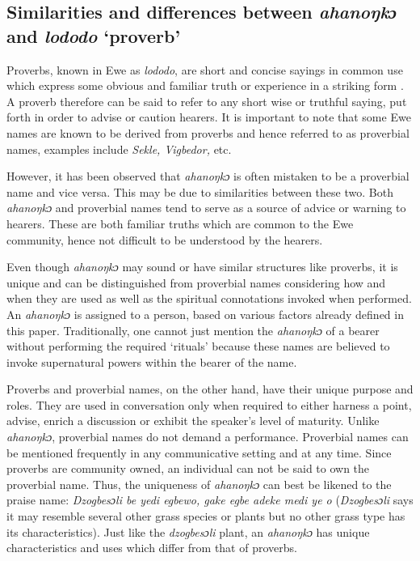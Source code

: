 \documentclass[output=paper]{langscibook}
\begin{document}
\subsection{Similarities and differences between \textit{ahanoŋkɔ} and \textit{lododo} `proverb'}
Proverbs, known in Ewe as {\textit{lododo}}, are short and concise sayings in common use which express some obvious and familiar truth or experience in a striking form  \citep[365]{d1977some}. A proverb therefore can be said to refer to any short wise or truthful saying, put forth in order to advise or caution hearers. It is important to note that some Ewe names are known to be derived from proverbs and hence referred to as proverbial names, examples include {\textit{Sekle, Vigbedor,}} etc.

However, it has been observed that {\textit{ahanoŋkɔ}} is often mistaken to be a proverbial name and vice versa. This may be due to similarities between these two. Both {\textit{ahanoŋkɔ}} and proverbial names tend to serve as a source of advice or warning to hearers. These are both familiar truths which are common to the Ewe community, hence not difficult to be understood by the hearers.

Even though {\textit{ahanoŋkɔ}} may sound or have similar structures like proverbs, it is unique and can be distinguished from proverbial names considering how and when they are used as well as the spiritual connotations invoked when performed. An {\textit{ahanoŋkɔ}} is assigned to a person, based on various factors already defined in this paper. Traditionally, one cannot just mention the {\textit{ahanoŋkɔ}} of a bearer without performing the required ‘rituals’ because these names are believed to invoke supernatural powers within the bearer of the name.

Proverbs and proverbial names, on the other hand, have their unique purpose and roles. They are used in conversation only when required to either harness a point, advise,
enrich a discussion or exhibit the speaker’s level of maturity. Unlike {\textit{ahanoŋkɔ}}, proverbial names do not demand a performance.  Proverbial names can be mentioned frequently in any communicative setting and at any time. Since proverbs are community owned, an individual can not be said to own the proverbial name. Thus, the uniqueness of {\textit{ahanoŋkɔ}} can best be likened to the praise name: \textit{Dzogbesɔli be yedi egbewo, gake egbe adeke medi ye o} ({\textit{Dzogbesɔli}} says it may resemble several other grass species or plants but no other grass type has its characteristics). Just like the {\textit{dzogbesɔli}} plant, an {\textit{ahanoŋkɔ}} has unique characteristics and uses which differ from that of proverbs.
\end{document}
